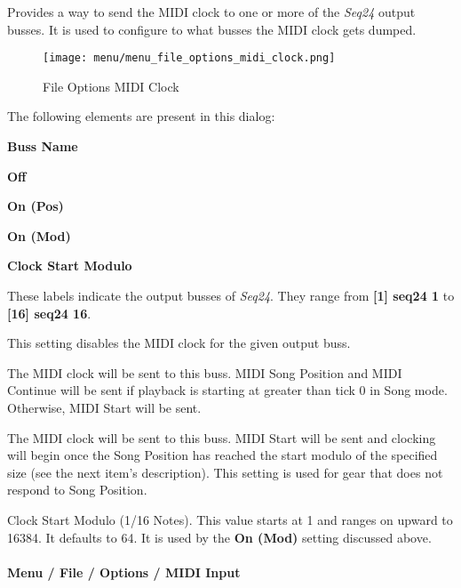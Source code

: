    Provides a way to send the MIDI clock to one or more of the
   \textsl{Seq24} output busses.
   It is used to configure to what busses the MIDI clock gets dumped.

\begin{figure}[H]
   \centering 
   \texttt{[image: menu/menu\_file\_options\_midi\_clock.png]}
   \caption{File Options MIDI Clock}
   \label{fig:seq24_menu_file_options_midi_clock}
\end{figure}

   The following elements are present in this dialog:

   \begin{enumber}
      \item \textbf{Buss Name}
      \item \textbf{Off}
      \item \textbf{On (Pos)}
      \item \textbf{On (Mod)}
      \item \textbf{Clock Start Modulo}
   \end{enumber}

   \setcounter{ItemCounter}{0}      %

   These labels indicate the output busses of \textsl{Seq24}.
   They range from \textbf{[1] seq24 1}
   to \textbf{[16] seq24 16}.

   This setting disables the MIDI clock for the given output buss.

   The MIDI clock will be sent to this buss.
   MIDI Song Position and MIDI Continue will be sent if playback is starting
   at greater than tick 0 in Song mode.  Otherwise, MIDI Start will be sent.

   The MIDI clock will be sent to this buss.
   MIDI Start will be sent and clocking will begin
   once the Song Position has reached the start modulo of the specified size
   (see the next item's description).
   This setting is used for gear that does not respond to Song Position.

   Clock Start Modulo (1/16 Notes).
   This value starts at 1 and ranges on upward to 16384.
   It  defaults to 64.
   It is used by the \textbf{On (Mod)} setting discussed above.

\paragraph{Menu / File / Options / MIDI Input}
\label{paragraph:seq24_menu_file_options_midi_input}

